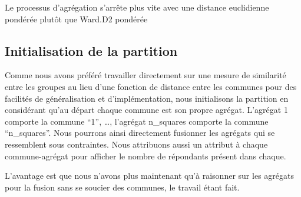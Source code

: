 \documentclass[
]{article}
\newenvironment{Shaded}{\begin{snugshade}}{\end{snugshade}}
\newcommand{\CommentTok}[1]{\textcolor[rgb]{0.56,0.35,0.01}{\textit{#1}}}
\newcommand{\ControlFlowTok}[1]{\textcolor[rgb]{0.13,0.29,0.53}{\textbf{#1}}}
\newcommand{\DecValTok}[1]{\textcolor[rgb]{0.00,0.00,0.81}{#1}}
\newcommand{\FunctionTok}[1]{\textcolor[rgb]{0.00,0.00,0.00}{#1}}
\newcommand{\NormalTok}[1]{#1}
\newcommand{\OtherTok}[1]{\textcolor[rgb]{0.56,0.35,0.01}{#1}}
\newcommand{\SpecialCharTok}[1]{\textcolor[rgb]{0.00,0.00,0.00}{#1}}
\newcommand{\StringTok}[1]{\textcolor[rgb]{0.31,0.60,0.02}{#1}}
\begin{document}
Le processus d'agrégation s'arrête plus vite avec une distance
euclidienne pondérée plutôt que Ward.D2 pondérée

\hypertarget{initialisation-de-la-partition}{%
\subsection{Initialisation de la
partition}\label{initialisation-de-la-partition}}

Comme nous avons préféré travailler directement sur une mesure de
similarité entre les groupes au lieu d'une fonction de distance entre
les communes pour des facilités de généralisation et d'implémentation,
nous initialisons la partition en considérant qu'au départ chaque
commune est son propre agrégat. L'agrégat 1 comporte la commune ``1'',
\ldots, l'agrégat n\_squares comporte la commune ``n\_squares''. Nous
pourrons ainsi directement fusionner les agrégats qui se ressemblent
sous contraintes. Nous attribuons aussi un attribut à chaque
commune-agrégat pour afficher le nombre de répondants présent dans
chaque.

L'avantage est que nous n'avons plus maintenant qu'à raisonner sur les
agrégats pour la fusion sans se soucier des communes, le travail étant
fait.

\begin{Shaded}
\end{Shaded}
\end{document}
